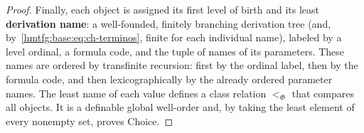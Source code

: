 \begin{proof}
Finally, each object is assigned its first level of birth and its least
\textbf{derivation name}: a well-founded, finitely branching derivation tree
(and, by~\eqref{hmtfg:base:eq:ch-terminos}, finite for each individual name), labeled by
a level ordinal, a formula code, and the tuple of names of its parameters.
These names are ordered by transfinite recursion: first by the ordinal label,
then by the formula code, and then lexicographically by the already ordered
parameter names. The least name of each value defines a class relation
\(<_{\mathfrak G}\) that compares all objects. It is a definable global
well-order and, by taking the least element of every nonempty set, proves
Choice.
\end{proof}


